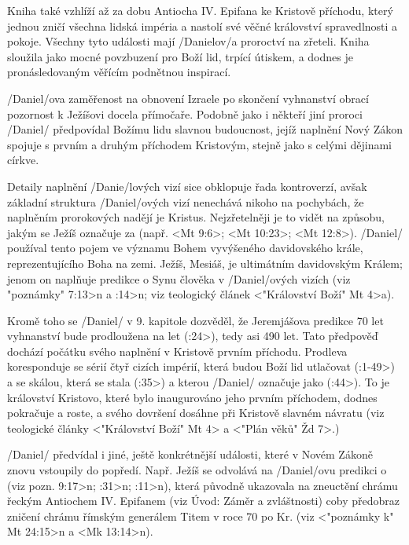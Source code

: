 Kniha také vzhlíží až za dobu Antiocha IV. Epifana ke Kristově příchodu, který jednou zničí všechna lidská impéria a nastolí své věčné království spravedlnosti a pokoje. Všechny tyto události mají \x/Danielov/a proroctví na zřeteli.
Kniha sloužila jako mocné povzbuzení pro Boží lid, trpící útiskem, a dodnes je pronásledovaným věřícím podnětnou inspirací. 


\x/Daniel/ova zaměřenost na obnovení Izraele po skončení vyhnanství obrací pozornost k Ježíšovi docela přímočaře.
Podobně jako i někteří jiní proroci \x/Daniel/ předpovídal Božímu lidu slavnou budoucnost, jejíž naplnění Nový Zákon 
spojuje s prvním a druhým příchodem Kristovým, stejně jako s celými dějinami církve.

Detaily naplnění \x/Danie/lových vizí sice obklopuje řada kontroverzí, avšak základní struktura \x/Daniel/ových vizí nenechává nikoho na pochybách, že naplněním prorokových nadějí je Kristus.
Nejzřetelněji je to vidět na způsobu, jakým se Ježíš označuje za  (např. <Mt 9:6>; <Mt 10:23>; <Mt 12:8>).
\x/Daniel/ používal tento pojem ve významu Bohem vyvýšeného davidovského krále, reprezentujícího Boha na zemi.
Ježíš, Mesiáš, je ultimátním davidovským Králem; jenom on naplňuje predikce o Synu člověka v \x/Daniel/ových vizích (viz \<"poznámky" 7:13>n a :14>n; viz teologický článek 
<"Království Boží"  Mt 4>a). 

Kromě toho se \x/Daniel/ v 9. kapitole dozvěděl, že Jeremjášova predikce 70 let vyhnanství bude prodloužena 
na  let (:24>), tedy asi 490 let.
Tato předpověď dochází počátku svého naplnění v Kristově prvním příchodu. Prodleva koresponduje se sérií čtyř cizích impérií, která budou Boží lid utlačovat (:1-49>) a se skálou, která se stala  (:35>) a kterou \x/Daniel/ označuje jako  (:44>). 
To je království Kristovo, které bylo inaugurováno jeho prvním příchodem, dodnes pokračuje a roste, a svého dovršení dosáhne při Kristově slavném návratu (viz teologické články <"Království Boží" Mt 4> a <"Plán věků" Žd 7>.)

\x/Daniel/ předvídal i jiné, ještě konkrétnější události, které v Novém Zákoně znovu vstoupily do popředí.
Např. Ježíš  se odvolává na \x/Daniel/ovu predikci o  (viz \<pozn. 9:17>n; :31>n; :11>n),
která původně ukazovala na zneuctění chrámu řeckým Antiochem IV. Epifanem (viz Úvod: Záměr a zvláštnosti) coby předobraz zničení chrámu  římským generálem Titem v roce 70 po Kr. (viz <"poznámky k" Mt 24:15>n a <Mk 13:14>n).

